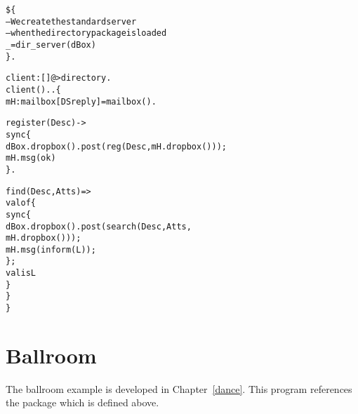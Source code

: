 \begin{alltt}
  \$\{
    -- We create the standard server
    -- when the directory package is loaded
    _ = dir_server(dBox)
  \}.

  client:[]@>directory.
  client()..\{
    mH:mailbox[DSreply] = mailbox().

    register(Desc) ->
      sync\{
        dBox.dropbox().post(reg(Desc,mH.dropbox()));
        mH.msg(ok)
      \}.
      
    find(Desc,Atts) =>
      valof\{
        sync \{ 
          dBox.dropbox().post(search(Desc,Atts,
                              mH.dropbox()));
          mH.msg(inform(L));
        \};
        valis L
     \}
  \}
\}
\end{alltt}

\section{Ballroom}
\label{sample:ballroom}
The ballroom example is developed in Chapter~\vref{dance}. This program references the package  which is defined above.

